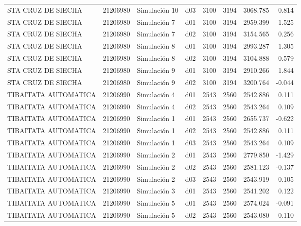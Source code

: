 \begin{landscape}
\begin{longtable}{lrlp{2cm}p{2cm}p{3cm}p{2cm}r}
      STA CRUZ DE SIECHA &  21206980 &  Simulación 10 &   d03 &      3100 &     3194 &  3068.785 &     0.814 \\
      STA CRUZ DE SIECHA &  21206980 &   Simulación 7 &   d01 &      3100 &     3194 &  2959.399 &     1.525 \\
      STA CRUZ DE SIECHA &  21206980 &   Simulación 7 &   d02 &      3100 &     3194 &  3154.565 &     0.256 \\
      STA CRUZ DE SIECHA &  21206980 &   Simulación 8 &   d01 &      3100 &     3194 &  2993.287 &     1.305 \\
      STA CRUZ DE SIECHA &  21206980 &   Simulación 8 &   d02 &      3100 &     3194 &  3104.888 &     0.579 \\
      STA CRUZ DE SIECHA &  21206980 &   Simulación 9 &   d01 &      3100 &     3194 &  2910.266 &     1.844 \\
      STA CRUZ DE SIECHA &  21206980 &   Simulación 9 &   d02 &      3100 &     3194 &  3200.764 &    -0.044 \\
    TIBAITATA AUTOMATICA &  21206990 &   Simulación 4 &   d01 &      2543 &     2560 &  2542.886 &     0.111 \\
    TIBAITATA AUTOMATICA &  21206990 &   Simulación 4 &   d02 &      2543 &     2560 &  2543.264 &     0.109 \\
    TIBAITATA AUTOMATICA &  21206990 &   Simulación 1 &   d01 &      2543 &     2560 &  2655.737 &    -0.622 \\
    TIBAITATA AUTOMATICA &  21206990 &   Simulación 1 &   d02 &      2543 &     2560 &  2542.886 &     0.111 \\
    TIBAITATA AUTOMATICA &  21206990 &   Simulación 1 &   d03 &      2543 &     2560 &  2543.264 &     0.109 \\
    TIBAITATA AUTOMATICA &  21206990 &   Simulación 2 &   d01 &      2543 &     2560 &  2779.850 &    -1.429 \\
    TIBAITATA AUTOMATICA &  21206990 &   Simulación 2 &   d02 &      2543 &     2560 &  2581.123 &    -0.137 \\
    TIBAITATA AUTOMATICA &  21206990 &   Simulación 2 &   d03 &      2543 &     2560 &  2543.919 &     0.105 \\
    TIBAITATA AUTOMATICA &  21206990 &   Simulación 3 &   d01 &      2543 &     2560 &  2541.202 &     0.122 \\
    TIBAITATA AUTOMATICA &  21206990 &   Simulación 5 &   d01 &      2543 &     2560 &  2574.024 &    -0.091 \\
    TIBAITATA AUTOMATICA &  21206990 &   Simulación 5 &   d02 &      2543 &     2560 &  2543.080 &     0.110 \\

\end{longtable}
\end{landscape}
